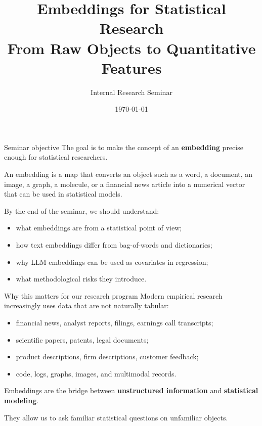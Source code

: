 \documentclass[aspectratio=169]{beamer}
\title[Embeddings for Statistical Research]{Embeddings for Statistical Research\\\large From Raw Objects to Quantitative Features}
\author{Internal Research Seminar}
\institute{Prepared for an academic statistics audience}
\date{\today}
\begin{document}
\begin{frame}
  \titlepage
\end{frame}

\begin{frame}{Seminar objective}
\large
The goal is to make the concept of an \textbf{embedding} precise enough for statistical researchers.

\vspace{0.3cm}

\begin{bluebox}
An embedding is a map that converts an object such as a word, a document, an image, a graph, a molecule, or a financial news article into a numerical vector that can be used in statistical models.
\end{bluebox}

\vspace{0.3cm}

By the end of the seminar, we should understand:
\begin{itemize}
  \item what embeddings are from a statistical point of view;
  \item how text embeddings differ from bag-of-words and dictionaries;
  \item why LLM embeddings can be used as covariates in regression;
  \item what methodological risks they introduce.
\end{itemize}
\end{frame}

\begin{frame}{Why this matters for our research program}
\large
Modern empirical research increasingly uses data that are not naturally tabular:

\vspace{0.2cm}

\begin{itemize}
  \item financial news, analyst reports, filings, earnings call transcripts;
  \item scientific papers, patents, legal documents;
  \item product descriptions, firm descriptions, customer feedback;
  \item code, logs, graphs, images, and multimodal records.
\end{itemize}

\vspace{0.25cm}

\begin{greenbox}
Embeddings are the bridge between \textbf{unstructured information} and \textbf{statistical modeling}.
\end{greenbox}

\vspace{0.2cm}

They allow us to ask familiar statistical questions on unfamiliar objects.
\end{frame}
\end{document}
